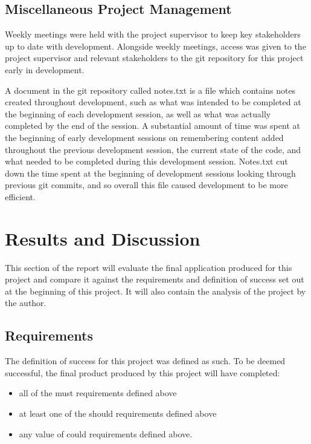 \documentclass{article}
\begin{document}
\subsection{Miscellaneous Project Management}

Weekly meetings were held with the project supervisor to keep key stakeholders up to date with development. Alongside weekly meetings, access was given to the project supervisor and relevant stakeholders to the git repository for this project early in development. \par

A document in the git repository called notes.txt is a file which contains notes created throughout development, such as what was intended to be completed at the beginning of each development session, as well as what was actually completed by the end of the session. A substantial amount of time was spent at the beginning of early development sessions on remembering content added throughout the previous development session, the current state of the code, and what needed to be completed during this development session. Notes.txt cut down the time spent at the beginning of development sessions looking through previous git commits, and so overall this file caused development to be more efficient. \par

\section{Results and Discussion}
\label{section:results}

This section of the report will evaluate the final application produced for this project and compare it against the requirements and definition of success set out at the beginning of this project. It will also contain the analysis of the project by the author. 

\subsection{Requirements}

The definition of success for this project was defined as such. To be deemed successful, the final product produced by this project will have completed: 

\begin{itemize}
	\item all of the must requirements defined above
	\item at least one of the should requirements defined above
	\item any value of could requirements defined above.
\end{itemize}
\end{document}

